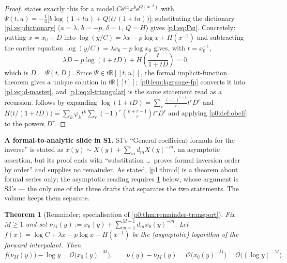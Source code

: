 \documentclass[11pt,a4paper,oneside]{book}
\theoremstyle{plain}
\newtheorem{theorem}{Theorem}[chapter]
\theoremstyle{definition}
\theoremstyle{remark}
\newcommand{\Real}{\mathbb{R}}
\newcommand{\e}{\mathrm{e}}
\newcommand{\bigO}{\mathcal{O}}
\begin{document}
\begin{proof}
 states exactly this for a model
$C\e^{ax}x^{b}\e^{Q(x^{-\delta})}$ with $\Psi(t,u)
=-\frac1a\bigl[b\log(1+tu)+Q\bigl(t/(1+tu)\bigr)\bigr]$; substituting the dictionary
\cref{p1:eq:dictionary} ($a=\lambda$, $b=-p$, $\delta=1$, $Q=H$) gives \cref{p1:eq:Psi}.
Concretely: putting $x=x_0+D$ into $\log(y/C)=\lambda x-p\log x+H(x^{-1})$ and subtracting the
carrier equation $\log(y/C)=\lambda x_0-p\log x_0$ gives, with $t=x_0^{-1}$,
\[
\lambda D-p\log(1+tD)+H\!\left(\frac{t}{1+tD}\right)=0,
\]
which is $D=\Psi(t,D)$.  Since $\Psi\in t\Real[[t,u]]$, the formal implicit-function theorem
gives a unique solution in $t\Real[[t]]$; \cref{p0:lem:lagrange-fp} converts it into
\cref{p1:eq:d-master}, and \cref{p1:eq:d-triangular} is the same statement read as a
recursion.  follows by expanding
$\log(1+tD)=\sum_r\frac{(-1)^{r-1}}{r}t^rD^r$ and
$H\bigl(t/(1+tD)\bigr)=\sum_k\varphi_kt^k\sum_r(-1)^r\binom{k+r-1}{r}t^rD^r$ and applying
\cref{p0:def:obell} to the powers $D^r$.
\end{proof}

\begin{repairbox}
\textbf{A formal-to-analytic slide in \textsf{S1}.}  \textsf{S1}'s ``General coefficient
formula for the inverse'' is stated as $x(y)\sim X(y)+\sum_md_mX(y)^{-m}$, an asymptotic
assertion, but its proof ends with ``substitution \dots\ proves formal inversion order by
order'' and supplies no remainder.  As stated, \cref{p1:thm:d} is a theorem about formal
series only; the asymptotic reading requires \cref{p1:thm:inverse-remainder} below, whose
argument is \textsf{S3}'s --- the only one of the three drafts that separates the two
statements.  The volume keeps them separate.
\end{repairbox}

\begin{theorem}[Remainder; specialisation of
\cref{p0:thm:remainder-transport}]
\label{p1:thm:inverse-remainder}
Fix $M\ge1$ and set $\nu_M(y):=x_0(y)+\sum_{m=1}^{M-1}d_mx_0(y)^{-m}$.  Let $f(x)=\log
C+\lambda x-p\log x+H(x^{-1})$ be the (asymptotic) logarithm of the forward interpolant.  Then
\begin{equation}
 f\bigl(\nu_M(y)\bigr)-\log y=\bigO\bigl(x_0(y)^{-M}\bigr),
 \qquad
 \nu(y)-\nu_M(y)=\bigO\bigl(x_0(y)^{-M}\bigr)=
 \bigO\bigl((\log y)^{-M}\bigr).
 \label{p1:eq:inverse-remainder}
\end{equation}
\end{theorem}
\end{document}

